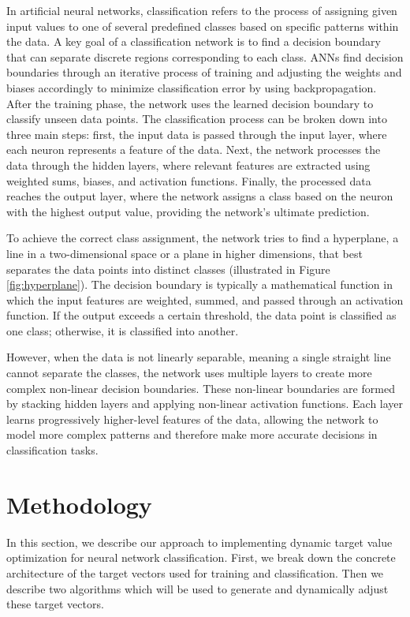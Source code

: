 \documentclass[12pt,fleqn,a4paper]{article}
\begin{document}
In artificial neural networks, classification refers to the process of assigning given input values to one of several predefined classes based on specific patterns within the data. A key goal of a classification network is to find a decision boundary that can separate discrete regions corresponding to each class. ANNs find decision boundaries through an iterative process of training and adjusting the weights and biases accordingly to minimize classification error by using backpropagation. After the training phase, the network uses the learned decision boundary to classify unseen data points. The classification process can be broken down into three main steps: first, the input data is passed through the input layer, where each neuron represents a feature of the data. Next, the network processes the data through the hidden layers, where relevant features are extracted using weighted sums, biases, and activation functions. Finally, the processed data reaches the output layer, where the network assigns a class based on the neuron with the highest output value, providing the network's ultimate prediction.

To achieve the correct class assignment, the network tries to find a hyperplane, a line in a two-dimensional space or a plane in higher dimensions, that best separates the data points into distinct classes (illustrated in Figure \ref{fig:hyperplane}). The decision boundary is typically a mathematical function in which the input features are weighted, summed, and passed through an activation function. If the output exceeds a certain threshold, the data point is classified as one class; otherwise, it is classified into another.

However, when the data is not linearly separable, meaning a single straight line cannot separate the classes, the network uses multiple layers to create more complex non-linear decision boundaries. These non-linear boundaries are formed by stacking hidden layers and applying non-linear activation functions. Each layer learns progressively higher-level features of the data, allowing the network to model more complex patterns and therefore make more accurate decisions in classification tasks.

\section{Methodology}
In this section, we describe our approach to implementing dynamic target value optimization for neural network classification. First, we break down the concrete architecture of the target vectors used for training and classification. Then we describe two algorithms which will be used to generate and dynamically adjust these target vectors.
\end{document}
